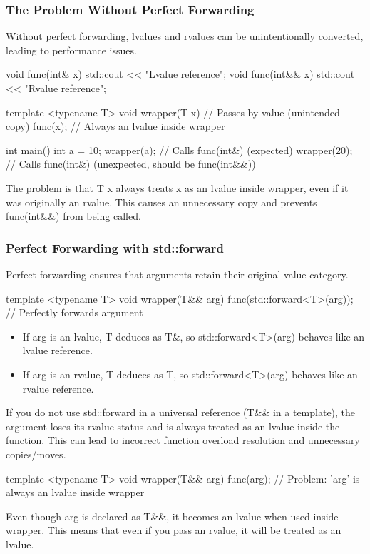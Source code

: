 \documentclass{report}
\begin{document}
\subsubsection{The Problem Without Perfect Forwarding}
\bigbreak \noindent 
Without perfect forwarding, lvalues and rvalues can be unintentionally converted, leading to performance issues.
\bigbreak \noindent 
\begin{cppcode}
    void func(int& x) { std::cout << "Lvalue reference\n"; }
    void func(int&& x) { std::cout << "Rvalue reference\n"; }

    template <typename T>
    void wrapper(T x) {  // Passes by value (unintended copy)
        func(x); // Always an lvalue inside wrapper
    }

    int main() {
        int a = 10;
        wrapper(a);  // Calls func(int&) (expected)
        wrapper(20); // Calls func(int&) (unexpected, should be func(int&&))
    }
\end{cppcode}
\bigbreak \noindent 
The problem is that T x always treats x as an lvalue inside wrapper, even if it was originally an rvalue. This causes an unnecessary copy and prevents func(int\&\&) from being called.
\bigbreak \noindent 
\subsubsection{ Perfect Forwarding with std::forward}
\bigbreak \noindent 
Perfect forwarding ensures that arguments retain their original value category.
\bigbreak \noindent 
\begin{cppcode}
    template <typename T>
    void wrapper(T&& arg) { 
        func(std::forward<T>(arg));  // Perfectly forwards argument
    }
\end{cppcode}
\begin{itemize}
    \item If arg is an lvalue, T deduces as T\&, so std::forward<T>(arg) behaves like an lvalue reference.
    \item If arg is an rvalue, T deduces as T, so std::forward<T>(arg) behaves like an rvalue reference.
\end{itemize}
\bigbreak \noindent 
If you do not use std::forward in a universal reference (T\&\& in a template), the argument loses its rvalue status and is always treated as an lvalue inside the function. This can lead to incorrect function overload resolution and unnecessary copies/moves.
\bigbreak \noindent 
\begin{cppcode}
    template <typename T>
    void wrapper(T&& arg) { 
        func(arg);  // Problem: 'arg' is always an lvalue inside wrapper
    }
\end{cppcode}
\bigbreak \noindent 
Even though arg is declared as T\&\&, it becomes an lvalue when used inside wrapper.
\bigbreak \noindent 
This means that even if you pass an rvalue, it will be treated as an lvalue.
\end{document}
